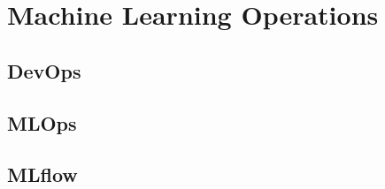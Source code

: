 \section{Machine Learning Operations}

\subsection{DevOps}


\subsection{MLOps}

\subsection{MLflow}